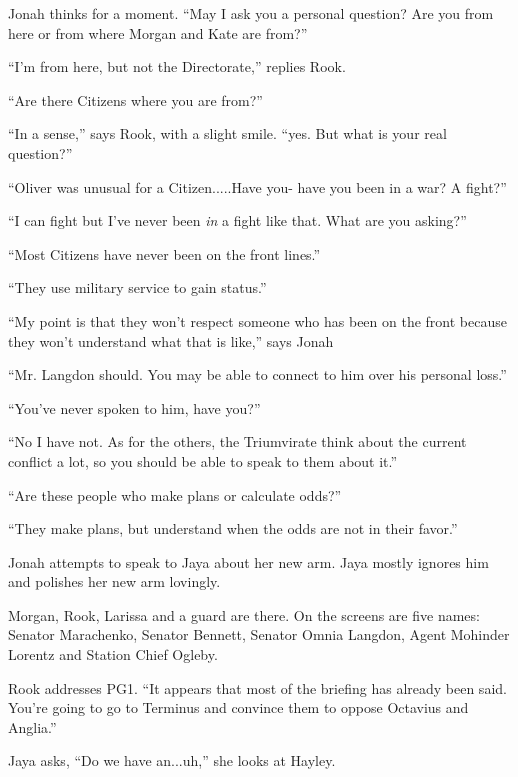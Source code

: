 Jonah thinks for a moment.  ``May I ask you a personal question?  Are you from here or from where Morgan and Kate are from?''

``I'm from here, but not the Directorate,'' replies Rook.

``Are there Citizens where you are from?''

``In a sense,'' says Rook, with a slight smile. ``yes.  But what is your real question?''

``Oliver was unusual for a Citizen.....Have you- have you been in a war?  A fight?''

``I can fight but I've never been \textit{in} a fight like that.  What are you asking?''

``Most Citizens have never been on the front lines.''

``They use military service to gain status.''

``My point is that they won't respect someone who has been on the front because they won't understand what that is like,'' says Jonah

``Mr. Langdon should.  You may be able to connect to him over his personal loss.''

``You've never spoken to him, have you?''

``No I have not.  As for the others, the Triumvirate think about the current conflict a lot, so you should be able to speak to them about it.''

``Are these people who make plans or calculate odds?''

``They make plans, but understand when the odds are not in their favor.''





Jonah attempts to speak to Jaya about her new arm.  Jaya mostly ignores him and polishes her new arm lovingly.





Morgan, Rook, Larissa and a guard are there.  On the screens are five names: Senator Marachenko, Senator Bennett, Senator Omnia Langdon, Agent Mohinder Lorentz and Station Chief Ogleby.



Rook addresses PG1. ``It appears that most of the briefing has already been said.  You're going to go to Terminus and convince them to oppose Octavius and Anglia.''

Jaya asks, ``Do we have an...uh,'' she looks at Hayley.


